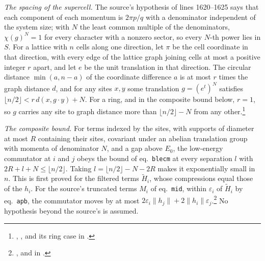 \documentclass{article}
\begin{document}
\emph{The spacing of the supercell.} The source's hypothesis of lines
1620--1625 says that each component of each momentum is $2\pi p/q$ with a
denominator independent of the system size; with $N$ the least common
multiple of the denominators, $\chi(g)^N=1$ for every character with a nonzero
sector, so every $N$-th power lies in $S$. For a lattice with $n$ cells along
one direction, let $\pi$ be the cell coordinate in that direction, with every
edge of the lattice graph joining cells at most a positive integer $r$ apart,
and let $e$ be the unit translation in that direction. The circular distance
$\min(a,n-a)$ of the coordinate difference $a$ is at most $r$ times the graph
distance $d$, and for any sites $x,y$ some translation $g=(e^t)^N$ satisfies
$\lfloor n/2\rfloor<r\,d(x,g\cdot y)+N$. For a ring, and in the composite
bound below, $r=1$, so $g$ carries any site to graph distance more than
$\lfloor n/2\rfloor-N$ from any
other.\footnote{,
    ,
     and its ring case
     in
    .}

\emph{The composite bound.} For terms indexed by the sites, with supports of
diameter at most $R$ containing their sites, covariant under an abelian
translation group with momenta of denominator $N$, and a gap above $E_0$, the
low-energy commutator at $i$ and $j$ obeys the bound of eq.~\texttt{blecm} at
every separation $l$ with $2R+l+N\le\lfloor n/2\rfloor$. Taking
$l=\lfloor n/2\rfloor-N-2R$ makes it exponentially small in $n$. This is first
proved for the filtered terms $\tilde H_i$, whose compressions equal those of
the $h_i$. For the source's truncated terms $M_i$ of eq.~\texttt{mid}, within
$\varepsilon_i$ of $\tilde H_i$ by eq.~\texttt{apb}, the commutator moves by at
most $2\varepsilon_i\lVert h_j\rVert+2\lVert h_i\rVert\varepsilon_j$.\footnote{,
     and
    in .}
No hypothesis beyond the source's is assumed.
\end{document}
